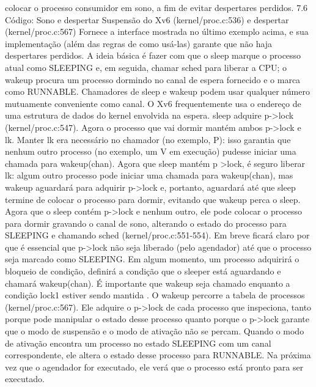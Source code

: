 colocar  o  processo  consumidor  em  sono,  a  fim  de  evitar  despertares  perdidos.
 7.6  Código:  Sono  e  despertar
 Suspensão  do  Xv6  (kernel/proc.c:536)  e  despertar  (kernel/proc.c:567)  Fornece  a  interface  mostrada  no  último  
exemplo  acima,  e  sua  implementação  (além  das  regras  de  como  usá-las)  garante  que  não  haja  despertares  
perdidos.  A  ideia  básica  é  fazer  com  que  o  sleep  marque  o  processo  atual  como  SLEEPING  e,  em  seguida,  
chamar  sched  para  liberar  a  CPU;  o  wakeup  procura  um  processo  dormindo  no  canal  de  espera  fornecido  e  o  
marca  como  RUNNABLE.  Chamadores  de  sleep  e  wakeup  podem  usar  qualquer  número  mutuamente  
conveniente  como  canal.  O  Xv6  frequentemente  usa  o  endereço  de  uma  estrutura  de  dados  do  kernel  envolvida  na  espera.
 sleep  adquire  p->lock  (kernel/proc.c:547).  Agora  o  processo  que  vai  dormir  mantém  ambos  p->lock
 e  lk.  Manter  lk  era  necessário  no  chamador  (no  exemplo,  P):  isso  garantia  que  nenhum  outro  processo  (no  
exemplo,  um  V  em  execução)  pudesse  iniciar  uma  chamada  para  wakeup(chan).  Agora  que  sleep  mantém  p
>lock,  é  seguro  liberar  lk:  algum  outro  processo  pode  iniciar  uma  chamada  para  wakeup(chan),  mas  wakeup  
aguardará  para  adquirir  p->lock  e,  portanto,  aguardará  até  que  sleep  termine  de  colocar  o  processo  para  dormir,  
evitando  que  wakeup  perca  o  sleep.
 Agora  que  o  sleep  contém  p->lock  e  nenhum  outro,  ele  pode  colocar  o  processo  para  dormir  gravando  o  
canal  de  sono,  alterando  o  estado  do  processo  para  SLEEPING  e  chamando  sched  (kernel/proc.c:551-554).
 Em  breve  ficará  claro  por  que  é  essencial  que  p->lock  não  seja  liberado  (pelo  agendador)  até  que  o  processo  
seja  marcado  como  SLEEPING.
 Em  algum  momento,  um  processo  adquirirá  o  bloqueio  de  condição,  definirá  a  condição  que  o  sleeper  está  aguardando  e  
chamará  wakeup(chan).  É  importante  que  wakeup  seja  chamado  enquanto  a  condição  lock1  estiver  sendo  mantida .  O  wakeup  
percorre  a  tabela  de  processos  (kernel/proc.c:567).  Ele  adquire  o  p->lock  de  cada  processo  que  inspeciona,  tanto  porque  pode  
manipular  o  estado  desse  processo  quanto  porque  o  p->lock  garante  que  o  modo  de  suspensão  e  o  modo  de  ativação  não  se  percam.  
Quando  o  modo  de  ativação  encontra  um  processo  no  estado  SLEEPING  com  um  canal  correspondente,  ele  altera  o  estado  desse  
processo  para  RUNNABLE.  Na  próxima  vez  que  o  agendador  for  executado,  ele  verá  que  o  processo  está  pronto  para  ser  executado.

